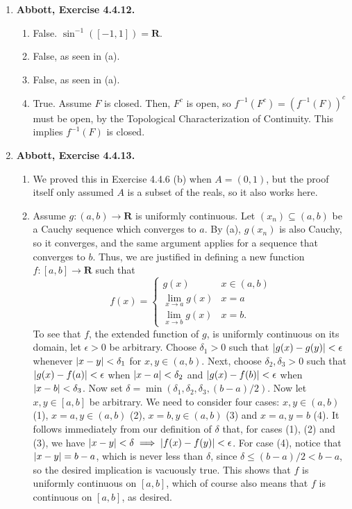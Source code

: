 \documentclass{article}
\DeclarePairedDelimiter\abs{\lvert}{\rvert}
\newcommand{\R}{\mathbf{R}}
\newcommand{\exc}[2][Abbott]{\item \textbf{#1, Exercise #2.}}
\newcommand{\lep}[1][L]{#1et $\epsilon > 0$ be arbitrary}
\let\oldsin\sin
\renewcommand{\sin}[1]{\oldsin \left( #1 \right)}
\begin{document}
\begin{enumerate}
    \exc{4.4.12}
    \begin{enumerate}
        \item False. $\oldsin^{-1}([-1,1]) = \R$.
        
        \item False, as seen in (a).
        
        \item False, as seen in (a). 
        
        \item True. Assume $F$ is closed. Then, $F^c$ is open, so $f^{-1}(F^c)=(f^{-1}(F))^c$ must be open, by the Topological Characterization of Continuity. This implies $f^{-1}(F)$ is closed.
    \end{enumerate}
    
    \exc{4.4.13}
    \begin{enumerate}
        \item We proved this in Exercise 4.4.6 (b) when $A = (0, 1)$, but the proof itself only assumed $A$ is a subset of the reals, so it also works here.
        
        \item Assume $g: (a, b) \to \R$ is uniformly continuous. Let $(x_n) \subseteq (a, b)$ be a Cauchy sequence which converges to $a$. By (a),  $g(x_n)$ is also Cauchy, so it converges, and the same argument applies for a sequence that converges to $b$. Thus, we are justified in defining a new function $f: [a, b] \to \R$ such that
        \begin{equation*}
            f(x) = 
            \begin{cases}
            g(x) & x \in (a, b) \\ 
            \lim_{x \to a} g(x) & x = a \\
            \lim_{x \to b} g(x) & x = b.
            \end{cases}
        \end{equation*} To see that $f$, the extended function of $g$, is uniformly continuous on its domain, \lep[l]. Choose $\delta_1 > 0$ such that $\abs{g(x)-g(y)} < \epsilon$ whenever $\abs{x-y} < \delta_1$ for $x,y \in (a, b)$. Next, choose $\delta_2, \delta_3 > 0$ such that $\abs{g(x)-f(a)} < \epsilon$ when $\abs{x-a} < \delta_2$ and $\abs{g(x)-f(b)} < \epsilon$ when $\abs{x-b} < \delta_3$. Now set $\delta = \min(\delta_1, \delta_2, \delta_3, (b-a)/2)$. Now let $x,y \in [a, b]$ be arbitrary. We need to consider four cases: $x,y \in (a, b)$ (1), $x = a, y \in (a, b)$ (2), $x = b, y \in (a, b)$ (3) and $x = a, y = b$ (4). It follows immediately from our definition of $\delta$ that, for cases (1), (2) and (3), we have $\abs{x-y} < \delta \implies \abs{f(x)-f(y)} < \epsilon$. For case (4), notice that $\abs{x-y}=b-a$, which is never less than $\delta$, since $\delta \leq (b-a)/2 < b-a$, so the desired implication is vacuously true. This shows that $f$ is uniformly continuous on $[a, b]$, which of course also means that $f$ is continuous on $[a, b]$, as desired.
        

\end{enumerate}
\end{enumerate}
\end{document}
